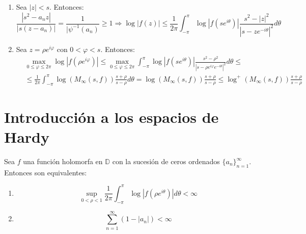 
\begin{remark}
    \hfill
    \begin{enumerate}
        \item Sea $|z| < s$.
              Entonces:
              $$\frac{|s^2-a_nz|}{|s(z-a_n)|} = \frac{1}{|\psi^{-1}(a_n)} \geq 1 \Rightarrow \log|f(z)| \leq \frac{1}{2\pi} \int_{-\pi}^\pi \log|f(se^{i\theta})|\frac{s^2-|z|^2}{|s-ze^{-i\theta}|^2}d\theta$$
        \item Sea $z = \rho e^{i\varphi}$ con $0 < \varphi < s$.
              Entonces:
              \begin{align*}
                   & \max_{0 \leq \varphi \leq 2\pi} \log|f(\rho e^{i\varphi})| \leq \max_{0 \leq \varphi \leq 2\pi} \int_{-\pi}^\pi \log|f(se^{i\theta})|\frac{s^2-\rho^2}{|s-\rho e^{i\varphi}e^{-i\theta}|^2}d\theta \leq \\
                   & \leq \frac{1}{2\pi} \int_{-\pi}^\pi \log(M_\infty(s, f))\frac{s+\rho}{s-\rho}d\theta = \log(M_\infty(s, f))\frac{s+\rho}{s-\rho} \leq \log^+(M_\infty(s, f))\frac{s+\rho}{s-\rho}
              \end{align*}
    \end{enumerate}
\end{remark}

\section{Introducción a los espacios de Hardy}
\begin{theorem}
    Sea $f$ una función holomorfa en $\mathbb{D}$ con la sucesión de ceros ordenados $\{a_n\}_{n=1}^\infty$.
    Entonces son equivalentes:
    \begin{enumerate}
        \item $$\sup_{0<\rho<1} \frac{1}{2\pi} \int_{-\pi}^\pi \log|f(\rho e^{i\theta})|d\theta < \infty$$
        \item $$\sum_{n=1}^\infty (1-|a_n|) < \infty$$
    \end{enumerate}
\end{theorem}

